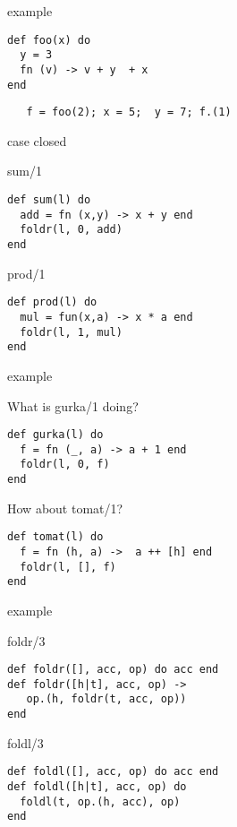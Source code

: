 \begin{frame}[fragile]{example}

\begin{verbatim}
def foo(x) do
  y = 3
  fn (v) -> v + y  + x 
end
\end{verbatim}
\pause\vspace{20pt}

\begin{verbatim}
   f = foo(2); x = 5;  y = 7; f.(1)
\end{verbatim}
\end{frame}

\begin{frame}[fragile]{case closed}

\pause
     \begin{block}{sum/1}
       \begin{verbatim}
def sum(l) do
  add = fn (x,y) -> x + y end
  foldr(l, 0, add)
end
       \end{verbatim}
     \end{block}
   \pause
     \begin{block}{prod/1}
       \begin{verbatim}
def prod(l) do
  mul = fun(x,a) -> x * a end
  foldr(l, 1, mul)
end
       \end{verbatim}
\vfill
     \end{block}

\end{frame}

\begin{frame}[fragile]{example}

\pause What is gurka/1 doing?

\pause\vspace{20pt}

\begin{verbatim}
def gurka(l) do
  f = fn (_, a) -> a + 1 end
  foldr(l, 0, f)
end
\end{verbatim}

\pause\vspace{20pt}
\pause How about tomat/1?

\pause\vspace{10pt}
\begin{verbatim}
def tomat(l) do 
  f = fn (h, a) ->  a ++ [h] end
  foldr(l, [], f)
end
\end{verbatim}
\end{frame}

\begin{frame}[fragile]{example}
     \begin{block}{foldr/3}
       \begin{verbatim}
def foldr([], acc, op) do acc end
def foldr([h|t], acc, op) ->
   op.(h, foldr(t, acc, op))
end
       \end{verbatim}
     \end{block}
\pause
     \begin{block}{foldl/3}
       \begin{verbatim}
def foldl([], acc, op) do acc end
def foldl([h|t], acc, op) do
  foldl(t, op.(h, acc), op)
end
       \end{verbatim}
     \end{block}
\end{frame}


